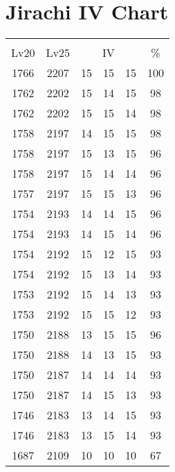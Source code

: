 \documentclass{article}%
\begin{document}
%
\normalsize%
\section{Jirachi IV Chart}%
\label{sec:Jirachi IV Chart}%
\renewcommand{\arraystretch}{1.5}%
\begin{tabular}{|c|c|c|c|c|c|}%
\hline%
\multicolumn{6}{|c|}{\textcolor{white}{ 
\linebreak{Jirachi}
}%
\cellcolor{black}}\\%
\multicolumn{1}{|c}{Lv20}&\multicolumn{1}{c|}{Lv25}&\multicolumn{3}{c|}{IV}&\multicolumn{1}{|c|}{\%}\\%
\hline%
\rowcolor{color100}%
1766&2207&15&15&15&100\\%
\hline%
\rowcolor{color98}%
1762&2202&15&14&15&98\\%
\hline%
\rowcolor{color98}%
1762&2202&15&15&14&98\\%
\hline%
\rowcolor{color98}%
1758&2197&14&15&15&98\\%
\hline%
\rowcolor{color96}%
1758&2197&15&13&15&96\\%
\hline%
\rowcolor{color96}%
1758&2197&15&14&14&96\\%
\hline%
\rowcolor{color96}%
1757&2197&15&15&13&96\\%
\hline%
\rowcolor{color96}%
1754&2193&14&14&15&96\\%
\hline%
\rowcolor{color96}%
1754&2193&14&15&14&96\\%
\hline%
\rowcolor{color93}%
1754&2192&15&12&15&93\\%
\hline%
\rowcolor{color93}%
1754&2192&15&13&14&93\\%
\hline%
\rowcolor{color93}%
1753&2192&15&14&13&93\\%
\hline%
\rowcolor{color93}%
1753&2192&15&15&12&93\\%
\hline%
\rowcolor{color96}%
1750&2188&13&15&15&96\\%
\hline%
\rowcolor{color93}%
1750&2188&14&13&15&93\\%
\hline%
\rowcolor{color93}%
1750&2187&14&14&14&93\\%
\hline%
\rowcolor{color93}%
1750&2187&14&15&13&93\\%
\hline%
\rowcolor{color93}%
1746&2183&13&14&15&93\\%
\hline%
\rowcolor{color93}%
1746&2183&13&15&14&93\\%
\hline%
\rowcolor{color91}%
1687&2109&10&10&10&67\\%
\end{tabular}

%
\end{document}
